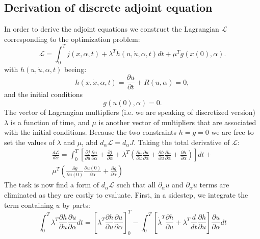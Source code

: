 \documentclass[10pt]{article}
\begin{document}
\subsection{Derivation of discrete adjoint equation}
In order to derive the adjoint equations we construct the Lagrangian $\mathcal{L}$ corresponding to the optimization problem:
\begin{equation}
\mathcal{L} = \int_{0}^{T} j\left(x,\alpha,t\right) +\lambda^T h(u,\dot u, \alpha,t) dt +\mu^T g(x(0),\alpha).
\end{equation}
with $h(u,\dot u, \alpha,t)$ beeing:
\begin{equation}
h(x,\dot x, \alpha,t) = \frac{\partial u}{\partial t} + R\left(u, \alpha \right) = 0,
\end{equation}
and the initial conditions
\begin{equation}
g(u(0),\alpha) = 0.
\end{equation}
The vector of Lagrangian multipliers (i.e. we are speaking of discretized version) $\lambda$ is a function of time, and $\mu$ is another vector of multipliers that are associated with the initial conditions. Because the two constraints $h = g = 0$ we are free to set the values of $\lambda$ and $\mu$, abd $d_{\alpha}\mathcal{L} = d_{\alpha}J$. Taking the total derivative of $\mathcal{L}$:
\begin{align}
\frac{d\mathcal{L}}{d \alpha} = \int_{0}^{T}\left[\frac{\partial j}{\partial u} \frac{\partial u}{\partial \alpha} + 
\frac{\partial j}{\partial \alpha} +
\lambda^T \left( \frac{\partial h}{\partial u} \frac{\partial u}{\partial \alpha} + \frac{\partial h}{\partial\dot u} \frac{\partial\dot u}{\partial \alpha} +
\frac{\partial h}{\partial \alpha} \right)\right] dt + \\
\mu^T \left( \frac{\partial g}{\partial u(0)} \frac{\partial u(0)}{\partial\alpha}  + \frac{\partial g}{\partial\alpha} \right)
\end{align}
The task is now find a form of $d_{\alpha}\mathcal{L}$ such that all $\partial_{\alpha} u$ and $\partial_{\alpha}\dot u$ terms are eliminated as they are costly to evaluate. First, in a sidestep, we integrate the term containing $\dot u$ by parts:
\begin{equation}
\int_{0}^{T} \lambda^T \frac{\partial h}{\partial\dot u} \frac{\partial\dot u}{\partial \alpha} dt =
\left[ \lambda^T \frac{\partial h}{\partial\dot u} \frac{\partial u}{\partial \alpha} \right]^{T}_{0} - 
\int_{0}^{T} \left[\dot \lambda^T \frac{\partial h}{\partial\dot u} + \lambda^T \frac{d}{dt}\frac{\partial h}{\partial\dot u} \right] 
\frac{\partial u}{\partial \alpha} dt
\end{equation}
\end{document}
